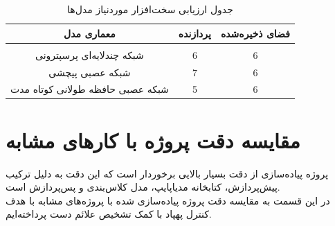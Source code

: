 \begin{table}[h!]
    \centering
    \begin{tabular}{||c c c||}
     \hline
     \rule{0pt}{3ex}معماری مدل & پردازنده & فضای ذخیره‌شده \\ [1.5ex]
     \hline
     \hline
     \rule{0pt}{0.5ex} & & \\  %
     شبکه چندلایه‌ای پرسپترونی & 6 & 6 \\ [2.5ex]
     شبکه عصبی پیچشی & 7 & 6 \\ [2.5ex]
     شبکه عصبی  حافظه طولانی کوتاه مدت & 5 & 6 \\ [2.5ex]
     \hline
    \end{tabular}
    \caption{جدول ارزیابی سخت‌افزار موردنیاز مدل‌ها}
    \label{table:4}
\end{table}

\section{مقایسه دقت پروژه با کارهای مشابه}
پروژه پیاده‌سازی از دقت بسیار بالایی برخوردار است که این دقت به دلیل ترکیب پیش‌پردازش، کتابخانه مدیاپایپ، مدل کلاس‌بندی و پس‌پردازش است. 
\\ در این قسمت به مقایسه دقت پروژه پیاده‌سازی شده با پروژه‌های مشابه با هدف کنترل پهپاد با کمک تشخیص علائم دست پرداخته‌ایم.


